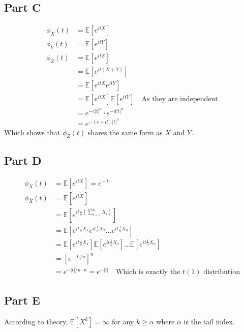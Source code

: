 \documentclass[
  oneside]{book}
\begin{document}
\hypertarget{part-c}{%
\subsection{Part C}\label{part-c}}

\[
\begin{aligned}
\phi_{X}(t) &= \mathbb{E}[e^{itX}]\\
\phi_{Y}(t) &= \mathbb{E}[e^{itY}]\\
\phi_{Z}(t) &= \mathbb{E}[e^{itZ}]\\
&= \mathbb{E}[e^{it(X+Y)}]\\
&=\mathbb{E}[e^{itX}e^{itY}]\\
&=\mathbb{E}[e^{itX}]\mathbb{E}[e^{itY}]
\quad \text{As they are independent}\\
&= e^{-c|t|^{\alpha}}\cdot e^{-d|t|^{\alpha}}\\
&= e^{-(c+d)|t|^{\alpha}}
\end{aligned}
\]
Which shows that \(\phi_{Z}(t)\) shares the same form as \(X\) and \(Y\).

\hypertarget{part-d}{%
\subsection{Part D}\label{part-d}}

\[
\begin{aligned}
\phi_{X}(t) &= \mathbb{E}[e^{itX}] = e^{-|t|}\\
\phi_{\bar{X}}(t) &= \mathbb{E}[e^{it\bar{X}}]\\
&= \mathbb{E}\left[ e^{it \frac{1}{n}\left(\sum^{n}_{i=1}X_{i} \right)} \right]\\
&=\mathbb{E}\left[ e^{it\frac{1}{n}X_{1}} e^{it\frac{1}{n}X_{2}}\dots e^{it\frac{1}{n}X_{n}}\right]\\
&= \mathbb{E}\left[ e^{it\frac{1}{n}X_{1}} \right] \mathbb{E}\left[e^{it\frac{1}{n}X_{2}}\right] \dots \mathbb{E}\left[e^{it\frac{1}{n}X_{n}}\right]\\
&= [e^{-|t|/n}]^{n}\\
&= e^{-|t|/n\cdot n} = e^{-|t|} \quad \text{Which is exactly the $t(1)$ distribution}
\end{aligned}
\]

\hypertarget{part-e}{%
\subsection{Part E}\label{part-e}}

According to theory, \(\mathbb{E}[X^{k}]=\infty\) for any \(k\geq \alpha\) where \(\alpha\) is the tail index.
\end{document}

